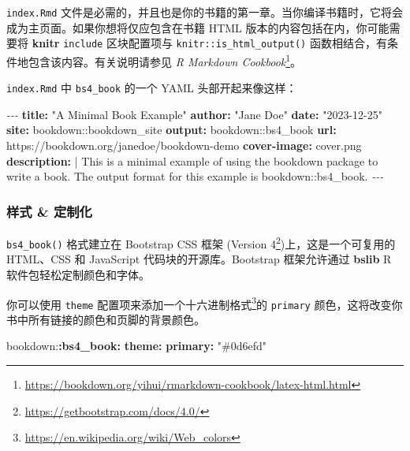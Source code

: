 \documentclass[
  12pt,
]{krantz}
\newenvironment{Shaded}{\begin{snugshade}}{\end{snugshade}}
\newcommand{\AttributeTok}[1]{\textcolor[rgb]{0.13,0.29,0.53}{#1}}
\newcommand{\CharTok}[1]{\textcolor[rgb]{0.31,0.60,0.02}{#1}}
\newcommand{\FunctionTok}[1]{\textcolor[rgb]{0.13,0.29,0.53}{\textbf{#1}}}
\newcommand{\KeywordTok}[1]{\textcolor[rgb]{0.13,0.29,0.53}{\textbf{#1}}}
\newcommand{\NormalTok}[1]{#1}
\newcommand{\PreprocessorTok}[1]{\textcolor[rgb]{0.56,0.35,0.01}{\textit{#1}}}
\newcommand{\StringTok}[1]{\textcolor[rgb]{0.31,0.60,0.02}{#1}}
\renewcommand{\href}[2]{#2\footnote{\url{#1}}}
\theoremstyle{definition}
\theoremstyle{definition}
\theoremstyle{definition}
\theoremstyle{definition}
\theoremstyle{remark}
\begin{document}
\texttt{index.Rmd} 文件是必需的，并且也是你的书籍的第一章。当你编译书籍时，它将会成为主页面。如果你想将仅应包含在书籍 HTML 版本的内容包括在内，你可能需要将 \textbf{knitr} \texttt{include} 区块配置项与 \texttt{knitr::is\_html\_output()} 函数相结合，有条件地包含该内容。有关说明请参见 \href{https://bookdown.org/yihui/rmarkdown-cookbook/latex-html.html}{\emph{R Markdown Cookbook}}。

\texttt{index.Rmd} 中 \texttt{bs4\_book} 的一个 YAML 头部开起来像这样：

\begin{Shaded}
\begin{Highlighting}[]
\PreprocessorTok{{-}{-}{-}}
\FunctionTok{title}\KeywordTok{:}\AttributeTok{ }\StringTok{"A Minimal Book Example"}
\FunctionTok{author}\KeywordTok{:}\AttributeTok{ }\StringTok{"Jane Doe"}
\FunctionTok{date}\KeywordTok{:}\AttributeTok{ }\StringTok{"2023{-}12{-}25"}
\FunctionTok{site}\KeywordTok{:}\AttributeTok{ bookdown::bookdown\_site}
\FunctionTok{output}\KeywordTok{:}\AttributeTok{ bookdown::bs4\_book}
\FunctionTok{url}\KeywordTok{:}\AttributeTok{ https://bookdown.org/janedoe/bookdown{-}demo}
\FunctionTok{cover{-}image}\KeywordTok{:}\AttributeTok{ cover.png}
\FunctionTok{description}\KeywordTok{: }\CharTok{|}
\NormalTok{  This is a minimal example of using the bookdown package to write a book.}
\NormalTok{  The output format for this example is bookdown::bs4\_book.}
\PreprocessorTok{{-}{-}{-}}
\end{Highlighting}
\end{Shaded}

\hypertarget{ux6837ux5f0f-ux5b9aux5236ux5316}{%
\subsubsection{样式 \& 定制化}\label{ux6837ux5f0f-ux5b9aux5236ux5316}}

\texttt{bs4\_book()} 格式建立在 Bootstrap CSS 框架 (\href{https://getbootstrap.com/docs/4.0/}{Version 4})上，这是一个可复用的 HTML、CSS 和 JavaScript 代码块的开源库。Bootstrap 框架允许通过 \textbf{bslib} R 软件包轻松定制颜色和字体。

你可以使用 \texttt{theme} 配置项来添加一个\href{https://en.wikipedia.org/wiki/Web_colors}{十六进制格式}的 \texttt{primary} 颜色，这将改变你书中所有链接的颜色和页脚的背景颜色。

\begin{Shaded}
\begin{Highlighting}[]
\AttributeTok{bookdown:}\FunctionTok{:bs4\_book}\KeywordTok{:}
\AttributeTok{  }\FunctionTok{theme}\KeywordTok{:}
\AttributeTok{    }\FunctionTok{primary}\KeywordTok{:}\AttributeTok{ }\StringTok{"\#0d6efd"}\AttributeTok{   }
\end{Highlighting}
\end{Shaded}
\end{document}
